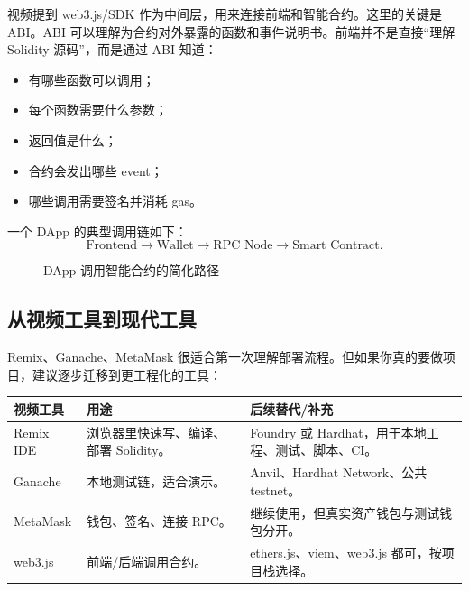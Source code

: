 \documentclass[UTF8,11pt]{ctexart}
\begin{document}
视频提到 web3.js/SDK 作为中间层，用来连接前端和智能合约。这里的关键是 ABI。ABI 可以理解为合约对外暴露的函数和事件说明书。前端并不是直接“理解 Solidity 源码”，而是通过 ABI 知道：
\begin{itemize}
  \item 有哪些函数可以调用；
  \item 每个函数需要什么参数；
  \item 返回值是什么；
  \item 合约会发出哪些 event；
  \item 哪些调用需要签名并消耗 gas。
\end{itemize}

一个 DApp 的典型调用链如下：
\[
\text{Frontend} \rightarrow \text{Wallet} \rightarrow \text{RPC Node} \rightarrow \text{Smart Contract}.
\]

\begin{figure}[h]
\centering
{}
\caption{DApp 调用智能合约的简化路径}
\end{figure}

\subsection{从视频工具到现代工具}

Remix、Ganache、MetaMask 很适合第一次理解部署流程。但如果你真的要做项目，建议逐步迁移到更工程化的工具：

\begin{longtable}{>{\raggedright\arraybackslash}p{3.2cm}>{\raggedright\arraybackslash}p{5.2cm}>{\raggedright\arraybackslash}p{5.3cm}}
\toprule
\textbf{视频工具} & \textbf{用途} & \textbf{后续替代/补充} \\
\midrule
\endhead
Remix IDE & 浏览器里快速写、编译、部署 Solidity。 & Foundry 或 Hardhat，用于本地工程、测试、脚本、CI。 \\
Ganache & 本地测试链，适合演示。 & Anvil、Hardhat Network、公共 testnet。 \\
MetaMask & 钱包、签名、连接 RPC。 & 继续使用，但真实资产钱包与测试钱包分开。 \\
web3.js & 前端/后端调用合约。 & ethers.js、viem、web3.js 都可，按项目栈选择。 \\
\bottomrule
\end{longtable}
\end{document}

